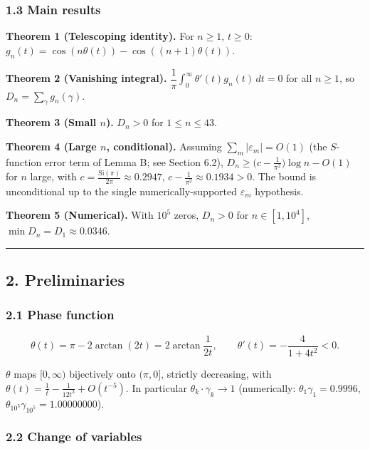 \documentclass[
]{article}
\begin{document}
\hypertarget{main-results}{%
\subsubsection{1.3 Main results}\label{main-results}}

\textbf{Theorem 1 (Telescoping identity).} For \(n \ge 1\), \(t \ge 0\):
\(g_n(t) = \cos(n\theta(t)) - \cos((n+1)\theta(t))\).

\textbf{Theorem 2 (Vanishing integral).}
\(\dfrac1\pi\int_0^\infty \theta'(t)g_n(t)\,dt = 0\) for all
\(n \ge 1\), so \(D_n = \sum_\gamma g_n(\gamma)\).

\textbf{Theorem 3 (Small \(n\)).} \(D_n > 0\) for \(1 \le n \le 43\).

\textbf{Theorem 4 (Large \(n\), conditional).} Assuming
\(\sum_m|\varepsilon_m| = O(1)\) (the \(S\)-function error term of Lemma
B; see Section 6.2),
\(D_n \ge \big(c - \tfrac{1}{\pi^2}\big)\log n - O(1)\) for \(n\) large,
with \(c = \tfrac{\mathrm{Si}(\pi)}{2\pi} \approx 0.2947\),
\(c - \tfrac{1}{\pi^2} \approx 0.1934 > 0\). The bound is unconditional
up to the single numerically-supported \(\varepsilon_m\) hypothesis.

\textbf{Theorem 5 (Numerical).} With \(10^5\) zeros, \(D_n > 0\) for
\(n \in [1, 10^4]\), \(\min D_n = D_1 \approx 0.0346\).

\begin{center}\rule{0.5\linewidth}{0.5pt}\end{center}

\hypertarget{preliminaries}{%
\subsection{2. Preliminaries}\label{preliminaries}}

\hypertarget{phase-function}{%
\subsubsection{2.1 Phase function}\label{phase-function}}

\[\theta(t) = \pi - 2\arctan(2t) = 2\arctan\frac{1}{2t}, \qquad \theta'(t) = -\frac{4}{1+4t^2} < 0.\]

\(\theta\) maps \([0,\infty)\) bijectively onto \((\pi,0]\), strictly
decreasing, with \(\theta(t) = \frac1t - \frac{1}{12t^3} + O(t^{-5})\).
In particular \(\theta_k\cdot\gamma_k \to 1\) (numerically:
\(\theta_1\gamma_1 = 0.9996\),
\(\theta_{10^5}\gamma_{10^5} = 1.00000000\)).

\hypertarget{change-of-variables}{%
\subsubsection{2.2 Change of variables}\label{change-of-variables}}
\end{document}
